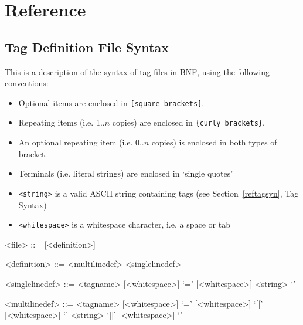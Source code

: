 %
%
%
%
%
%
% 
%
% 
% 
%

\chapter{Reference}
\section{Tag Definition File Syntax}
This is a description of the syntax of tag files in BNF, using the following conventions:
\begin{itemize}
\item Optional items are enclosed in \texttt{[square brackets]}. 
\item Repeating items (i.e. 1..$n$ copies) are enclosed in \texttt{\{curly brackets\}}.
\item An optional repeating item (i.e. 0..$n$ copies) is enclosed in both types of bracket.
\item Terminals (i.e. literal strings) are enclosed in `single quotes'
\item \texttt{<string>} is a valid ASCII string containing tags (see Section~\ref{reftagsyn}, Tag
Syntax)
\item \texttt{<whitespace>} is a whitespace character, i.e. a space or tab
\end{itemize}
\begin{MyVerbatim}
<file> ::= {[<definition>]}

<definition> ::= <multilinedef>|<singlelinedef>

<singlelinedef> ::= <tagname> {[<whitespace>]} `='
                    {[<whitespace>]} <string> `\n'

<multilinedef> ::= <tagname> {[<whitespace>]} `='
                    {[<whitespace>]} `[[' {[<whitespace>}] `\n'
                    {<string>} `]]' {[<whitespace>]} `\n'

\end{MyVerbatim}


